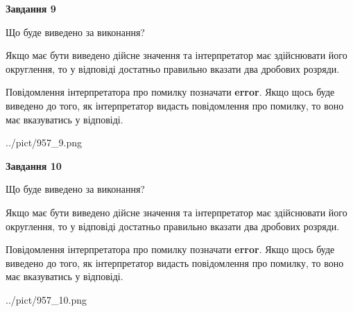 \documentclass[12pt, ukrainian]{article}
\begin{document}
{\begin {Large}
{\begin {center}\textbf{Завдання 9}\end {center}}\par
Що буде виведено за виконання? \par

Якщо має бути виведено дійсне значення та інтерпретатор має здійснювати його округлення, 
то у відповіді достатньо правильно вказати два дробових розряди.

Повідомлення інтерпретатора про помилку позначати \textbf{error}.
Якщо щось буде виведено до того, як інтерпретатор видасть повідомлення про помилку, 
то воно має вказуватись у відповіді. \par

\begin{center}
	{../pict/957_9.png}
\end{center}
\newpage

{\begin {center}\textbf{Завдання 10}\end {center}}\par
Що буде виведено за виконання? \par

Якщо має бути виведено дійсне значення та інтерпретатор має здійснювати його округлення, 
то у відповіді достатньо правильно вказати два дробових розряди.

Повідомлення інтерпретатора про помилку позначати \textbf{error}.
Якщо щось буде виведено до того, як інтерпретатор видасть повідомлення про помилку, 
то воно має вказуватись у відповіді. \par

\begin{center}
	{../pict/957_10.png}
\end{center}
\newpage

\end {Large}}
\end{document}
